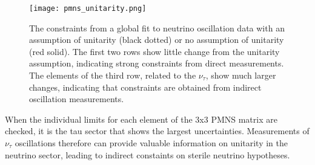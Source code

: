 \begin{landscape}
\begin{figure}[!h]%
	\centering
	\texttt{[image: pmns\_unitarity.png]}%
	\caption{The constraints from a global fit to neutrino oscillation data\cite{Parke-Unitarity} with an assumption of unitarity (black dotted) or no assumption of unitarity (red solid). The first two rows show little change from the unitarity assumption, indicating strong constraints from direct measurements. The elements of the third row, related to the $\nu_\tau$, show much larger changes, indicating that constraints are obtained from indirect oscillation measurements. }
	\label{fig:pmns_unitarity}
\end{figure}
\end{landscape}

When the individual limits for each element of the 3x3 PMNS matrix are checked, it is the tau sector that shows the largest uncertainties.
Measurements of $\nu_\tau$ oscillations therefore can provide valuable information on unitarity in the neutrino sector, leading to indirect constaints on sterile neutrino hypotheses.

